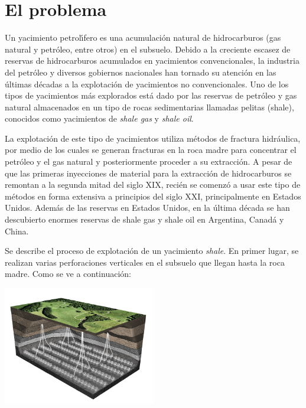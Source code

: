 \newpage
\section{El problema}\label{sec:problema}

Un yacimiento petrol\'\i fero es una acumulaci\'on natural de hidrocarburos (gas natural y petr\'oleo, entre otros) en el subsuelo. Debido a la creciente escasez de reservas de hidrocarburos acumulados en yacimientos convencionales, la industria del petr\'oleo y diversos gobiernos nacionales han tornado su atenci\'on en las \'ultimas d\'ecadas a la explotaci\'on de yacimientos no convencionales. Uno de los tipos de yacimientos m\'as explorados est\'a dado por las reservas de petr\'oleo y gas natural almacenados en un tipo de rocas sedimentarias llamadas pelitas (shale), conocidos como yacimientos de \emph{shale gas} y \emph{shale oil}.
 
La explotaci\'on de este tipo de yacimientos utiliza m\'etodos de fractura hidr\'aulica, por medio de los cuales se generan fracturas en la roca madre para concentrar el petr\'oleo y el gas natural y posteriormente proceder a su extracci\'on. A pesar de que las primeras inyecciones de material para la extracci\'on de hidrocarburos se remontan a la segunda mitad del siglo XIX, reci\'en se comenz\'o a usar este tipo de m\'etodos en forma extensiva a prin\-ci\-pios del siglo XXI, principalmente en Estados Unidos. Adem\'as de las reservas en Estados Unidos, en la \'ultima d\'ecada se han descubierto enormes reservas de shale gas y shale oil en Argentina, Canad\'a y China.

Se describe el proceso de explotaci\'on de un yacimiento \emph{shale}. En primer lugar, se realizan varias perforaciones verticales en el subsuelo que llegan hasta la roca madre. Como se ve a continuaci\'on:

\begin{center}
\includegraphics[width=0.5\textwidth]{imagenes/figura1}
\end{center}

